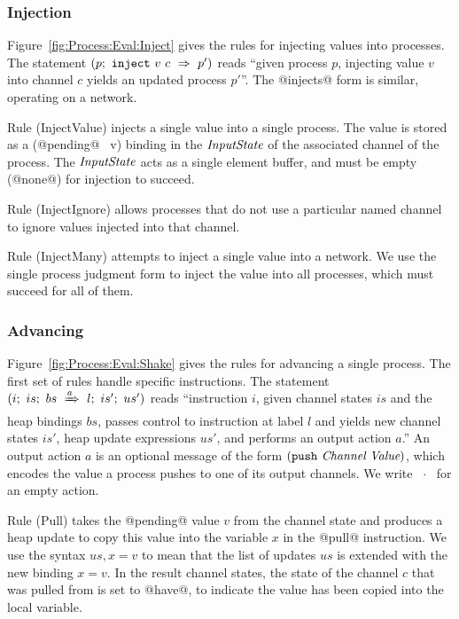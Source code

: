 \subsubsection{Injection}
Figure~\ref{fig:Process:Eval:Inject} gives the rules for injecting values into processes. The statement $(p;~\texttt{inject}~v~c~\Rightarrow~p')$ reads ``given process $p$, injecting value $v$ into channel $c$ yields an updated process $p'$''. The @injects@ form is similar, operating on a network.

Rule (InjectValue) injects a single value into a single process. The value is stored as a (@pending@~ v) binding in the $\textit{InputState}$ of the associated channel of the process. The $\textit{InputState}$ acts as a single element buffer, and must be empty (@none@) for injection to succeed.

Rule (InjectIgnore) allows processes that do not use a particular named channel to ignore values injected into that channel.

Rule (InjectMany) attempts to inject a single value into a network. We use the single process judgment form to inject the value into all processes, which must succeed for all of them.






\subsubsection{Advancing}
Figure~\ref{fig:Process:Eval:Shake} gives the rules for advancing a single process. The first set of rules handle specific instructions. The statement $(i;~is;~bs~\xRightarrow{a}~l;~is';~us')$ reads ``instruction $i$, given channel states $is$ and the heap bindings $bs$, passes control to instruction at label $l$ and yields new channel states $is'$, heap update expressions $us'$, and performs an output action $a$.'' An output action $a$ is an optional message of the form $(\texttt{push}~\textit{Channel}~\textit{Value})$, which encodes the value a process pushes to one of its output channels. We write ~$\cdot$~ for an empty action. 

Rule (Pull) takes the @pending@ value $v$ from the channel state and produces a heap update to copy this value into the variable $x$ in the @pull@ instruction. We use the syntax $us,x=v$ to mean that the list of updates $us$ is extended with the new binding $x=v$. In the result channel states, the state of the channel $c$ that was pulled from is set to @have@, to indicate the value has been copied into the local variable.


